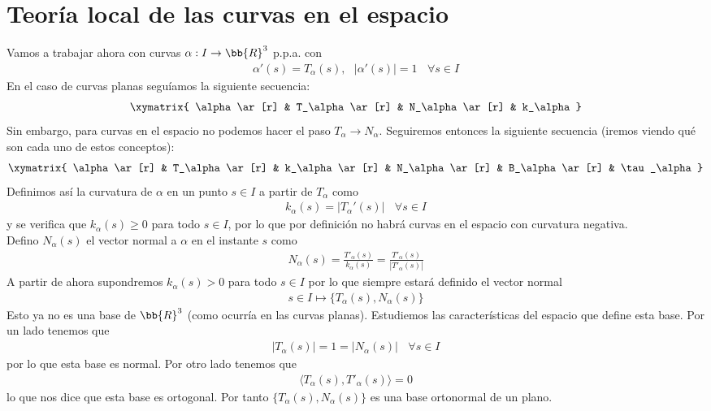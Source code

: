 \chapter{Teoría local de las curvas en el espacio}

Vamos a trabajar ahora con curvas $\alpha: I \to \bb{R}^3$ p.p.a. con
\begin{gather*}
    \alpha'(s) = T_\alpha(s),\ \ \ |\alpha'(s)| = 1\ \ \ \ \forall s \in I
\end{gather*}
En el caso de curvas planas seguíamos la siguiente secuencia:
\begin{gather*}
    \xymatrix{
        \alpha \ar[r] & T_\alpha \ar[r] & N_\alpha \ar[r] & k_\alpha
    }
\end{gather*}
Sin embargo, para curvas en el espacio no podemos hacer el paso $T_\alpha \to N_\alpha$. Seguiremos entonces la siguiente secuencia (iremos viendo qué son cada uno de estos conceptos):
\begin{gather*}
    \xymatrix{
        \alpha \ar[r] & T_\alpha \ar[r] & k_\alpha \ar[r] & N_\alpha \ar[r] & B_\alpha \ar[r] & \tau_\alpha
    }
\end{gather*}
Definimos así la curvatura de $\alpha$ en un punto $s\in I$ a partir de $T_\alpha$ como
\begin{gather*}
    k_\alpha(s) = |T_\alpha'(s)| \ \ \ \ \forall s \in I
\end{gather*} 
y se verifica que $k_\alpha(s) \geq 0$ para todo $s\in I$, por lo que por definición no habrá curvas en el espacio con curvatura negativa.\\

Defino $N_\alpha(s)$ el vector normal a $\alpha$ en el instante $s$ como 
\begin{gather*}
    N_\alpha(s) = \frac{T'_\alpha(s)}{k_\alpha(s)} = \frac{T'_\alpha(s)}{|T'_\alpha(s)|}
\end{gather*}
A partir de ahora supondremos $k_\alpha(s)>0$ para todo $s\in I$ por lo que siempre estará definido el vector normal 
\begin{gather*}
    s\in I \mapsto \{T_\alpha(s), N_\alpha(s)\}
\end{gather*}
Esto ya no es una base de $\bb{R}^3$ (como ocurría en las curvas planas). Estudiemos las características del espacio que define esta base. Por un lado tenemos que 
\begin{gather*}
    |T_\alpha(s)| = 1 = |N_\alpha(s)|\ \ \ \ \forall s \in I
\end{gather*}
por lo que esta base es normal. Por otro lado tenemos que 
\begin{gather*}
    \langle T_\alpha(s), T'_\alpha(s)\rangle = 0
\end{gather*}
lo que nos dice que esta base es ortogonal. Por tanto $\{T_\alpha(s), N_\alpha(s)\}$ es una base ortonormal de un plano. \\

